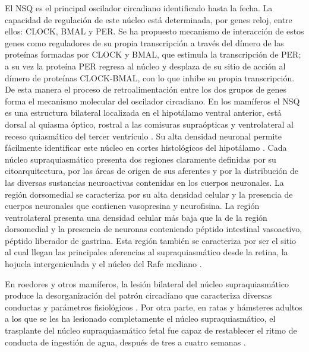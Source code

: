 \documentclass[12pt,letterpaper,final]{article}
\let\cite\cite %
\begin{document}
El NSQ es el principal oscilador circadiano identificado hasta la fecha. La capacidad de regulación de este núcleo está determinada, por genes reloj, entre ellos: CLOCK, BMAL y PER. Se ha propuesto mecanismo de interacción de estos genes como reguladores de su propia transcripción a través del dímero de las proteínas formadas por CLOCK y BMAL, que estimula la transcripción de PER; a su vez la proteína PER regresa al núcleo y desplaza de su sitio de acción al dímero de proteínas CLOCK-BMAL, con lo que inhibe su propia transcripción. De esta manera el proceso de retroalimentación entre los dos grupos de genes forma el mecanismo molecular del oscilador circadiano. En los mamíferos el NSQ es una estructura bilateral localizada en el hipotálamo ventral anterior, está dorsal al quiasma óptico, rostral a las comisuras supraópticas y ventrolateral al receso quiasmático del tercer ventrículo \cite{golombek2007}.
Su alta densidad neuronal permite fácilmente identificar este núcleo en cortes histológicos del hipotálamo \cite{VandenPol1991}.
Cada núcleo supraquiasmático presenta dos regiones claramente definidas por su citoarquitectura, por las áreas de origen de sus aferentes y por la distribución de las diversas sustancias neuroactivas contenidas en los cuerpos neuronales. La región dorsomedial se caracteriza por su alta densidad celular y la presencia de cuerpos neuronales que contienen vasopresina
y neurofisina. La región ventrolateral presenta una densidad celular más baja que la de la región dorsomedial y la presencia de neuronas conteniendo péptido intestinal vasoactivo, péptido liberador de gastrina. Esta región también se caracteriza por ser el sitio al cual llegan las principales aferencias al supraquiasmático desde la retina, la hojuela intergeniculada y el núcleo del Rafe mediano \cite{VandenPol1991}.

En roedores y otros mamíferos, la lesión bilateral del núcleo supraquiasmático produce la desorganización del patrón circadiano que caracteriza diversas conductas y parámetros fisiológicos \cite{Aguilar-Roblero1987}. Por otra parte, en ratas y hámsteres adultos a los que se les ha lesionado completamente el núcleo supraquiasmático, el trasplante del núcleo supraquiasmático fetal fue capaz de restablecer el ritmo de conducta de ingestión de agua, después de tres a cuatro semanas \cite{Drucker-Colin1984}.
\end{document}
